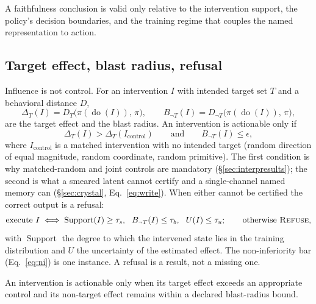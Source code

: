 \begin{proposition}
\label{prop:probe}
A faithfulness conclusion is valid only relative to the intervention support, the policy's
decision boundaries, and the training regime that couples the named representation to
action.
\end{proposition}

\subsection{Target effect, blast radius, refusal}
\label{sec:theory:control}

Influence is not control. For an intervention $I$ with intended target set $T$ and a
behavioral distance $D$,
\begin{equation}
\Delta_T(I) = D_T\big(\pi(\operatorname{do}(I)),\,\pi\big),
\qquad
B_{\neg T}(I) = D_{\neg T}\big(\pi(\operatorname{do}(I)),\,\pi\big),
\label{eq:target_blast}
\end{equation}
are the target effect and the blast radius. An intervention is actionable only if
\begin{equation}
\Delta_T(I) > \Delta_T(I_{\text{control}})
\qquad\text{and}\qquad
B_{\neg T}(I) \le \epsilon,
\label{eq:actionable}
\end{equation}
where $I_{\text{control}}$ is a matched intervention with no intended target (random
direction of equal magnitude, random coordinate, random primitive). The first condition is why
matched-random and joint controls are mandatory (\S\ref{sec:interpresults}); the second is what
a smeared latent cannot certify and a single-channel named memory can
(\S\ref{sec:crystal}, Eq.~\ref{eq:write}). When either cannot be certified the correct output
is a refusal:
\begin{equation}
\text{execute } I \iff
\operatorname{Support}(I)\ge\tau_s,\ \ B_{\neg T}(I)\le\tau_b,\ \ U(I)\le\tau_u;
\qquad \text{otherwise } \textsc{Refuse},
\label{eq:refuse}
\end{equation}
with $\operatorname{Support}$ the degree to which the intervened state lies in the training
distribution and $U$ the uncertainty of the estimated effect. The non-inferiority bar
(Eq.~\ref{eq:ni}) is one instance. A refusal is a result, not a missing one.

\begin{proposition}
\label{prop:control}
An intervention is actionable only when its target effect exceeds an appropriate control and
its non-target effect remains within a declared blast-radius bound.
\end{proposition}


